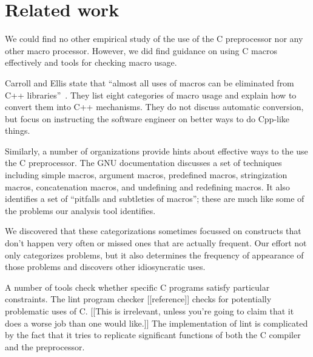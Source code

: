 \documentclass[10pt]{article}
\begin{document}
\section{Related work}
\label{sec:related}

We could find no other empirical study of the use of the C preprocessor nor
any other macro processor.  However, we did find guidance on using C macros
effectively and tools for checking macro usage.

Carroll and Ellis state that ``almost all uses of macros can be eliminated
from C++ libraries''~\cite[p.~146]{Carroll95}.  They list eight categories
of macro usage and explain how to convert them into C++ mechanisms.  They
do not discuss automatic conversion, but focus on instructing the software
engineer on better ways to do Cpp-like things.

Similarly, a number of organizations provide hints about effective ways to
the use the C preprocessor.  The GNU documentation discusses
a set of techniques including simple macros, argument macros, predefined
macros, stringization macros, concatenation macros, and undefining and
redefining macros.  It also identifies a set of ``pitfalls and subtleties
of macros''; these are much like some of the problems our analysis tool
identifies.

We discovered that these categorizations sometimes focussed on constructs
that don't happen very often or missed ones that are actually frequent.
Our effort not only categorizes problems, but it also determines the
frequency of appearance of those problems and discovers other idiosyncratic
uses.

A number of tools check whether specific C programs satisfy particular
constraints.  The lint program checker [[reference]]
checks for potentially problematic uses of C\@.  
[[This is irrelevant, unless you're going to claim that it does a worse job
than one would like.]]
The implementation of lint
is complicated by the fact that it tries to replicate significant functions
of both the C compiler and the preprocessor.
\end{document}
